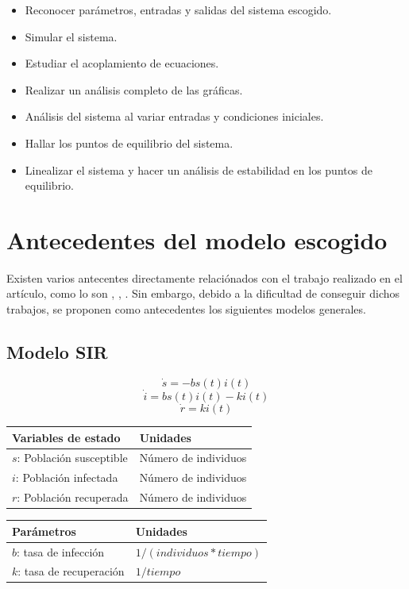 \documentclass{article}
\begin{document}
\begin{itemize}
    \item Reconocer parámetros, entradas y salidas del sistema escogido.
    \item Simular el sistema.
    \item Estudiar el acoplamiento de ecuaciones.
    \item Realizar un análisis completo de las gráficas.
    \item Análisis del sistema al variar entradas y condiciones iniciales.
    \item Hallar los puntos de equilibrio del sistema.
    \item Linealizar el sistema y hacer un análisis de estabilidad en los puntos de equilibrio.
\end{itemize}

\section{Antecedentes del modelo escogido}

Existen varios antecentes directamente relaciónados con el trabajo realizado en el
artículo, como lo son \cite{ieee1}, \cite{ieee2}, \cite{ieee3}. Sin embargo,
debido a la dificultad de conseguir dichos trabajos, se proponen como
antecedentes los siguientes modelos generales.

\newpage

    \subsection{Modelo SIR}

        \Large
        $$\dot{s} = -b s(t) i(t)$$
        $$\dot{i} = b s(t) i(t) - k i(t)$$
        $$\dot{r} = k i(t)$$
        \normalsize

        \vspace{0.5cm}

        \begin{tabular}[t]{|p{4cm} p{3.5cm}|}
            \hline
            \textbf{Variables de estado} & \textbf{Unidades} \\
            \hline
            $s$: Población susceptible & Número de individuos\\
            $i$: Población infectada  & Número de individuos\\
            $r$: Población recuperada & Número de individuos\\
            \hline
        \end{tabular}
        \hspace{0.5cm}
        \begin{tabular}[t]{|p{4cm} p{4cm}|}
            \hline
            \textbf{Parámetros} & \textbf{Unidades} \\
            \hline
            $b$: tasa de infección    & $1/(individuos * tiempo)$\\
            $k$: tasa de recuperación & $1/tiempo$\\
            \hline
        \end{tabular}
        \cite{sir}
\end{document}
